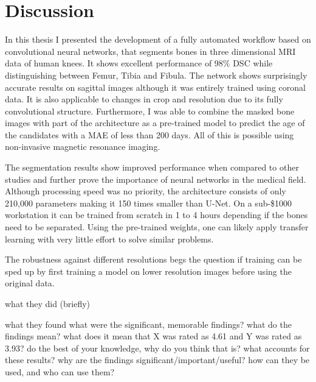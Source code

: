 \section{Discussion}

In this thesis I presented the development of a fully automated workflow based on convolutional neural networks, that segments bones in three dimensional MRI data of human knees. It shows excellent performance of 98\% DSC while distinguishing between Femur, Tibia and Fibula. The network shows surprisingly accurate results on sagittal images although it was entirely trained using coronal data. It is also applicable to changes in crop and resolution due to its fully convolutional structure. Furthermore, I was able to combine the masked bone images with part of the architecture as a pre-trained model to predict the age of the candidates with a MAE of less than 200 days. All of this is possible using non-invasive magnetic resonance imaging.

The segmentation results show improved performance when compared to other studies and further prove the importance of neural networks in the medical field. Although processing speed was no priority, the architecture consists of only 210,000 parameters making it 150 times smaller than U-Net. On a sub-\$1000 workstation it can be trained from scratch in 1 to 4 hours depending if the bones need to be separated. Using the pre-trained weights, one can likely apply transfer learning with very little effort to solve similar problems.

The robustness against different resolutions begs the question if training can be sped up by first training a model on lower resolution images before using the original data.


what they did (briefly)

what they found
what were the significant, memorable findings?
what do the findings mean?
what does it mean that X was rated as 4.61 and Y was rated as 3.93?
do the best of your knowledge, why do you think that is? what accounts for these results?
why are the findings significant/important/useful? how can they be used, and who can use them?

\newpage